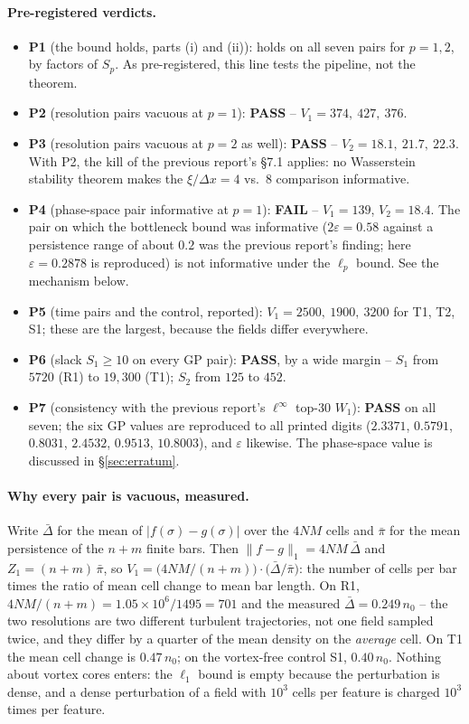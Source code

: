 \documentclass[11pt,a4paper]{article}
\begin{document}
\paragraph{Pre-registered verdicts.}
\begin{itemize}[nosep]
\item \textbf{P1} (the bound holds, parts (i) and (ii)): holds on all seven pairs for $p=1,2$, by
factors of $S_p$. As pre-registered, this line tests the pipeline, not the theorem.
\item \textbf{P2} (resolution pairs vacuous at $p=1$): \textbf{PASS} -- $V_1=374,\ 427,\ 376$.
\item \textbf{P3} (resolution pairs vacuous at $p=2$ as well): \textbf{PASS} -- $V_2=18.1,\ 21.7,\
22.3$. With P2, the kill of the previous report's \S7.1 applies: no Wasserstein stability theorem
makes the $\xi/\Delta x=4$ vs.\ $8$ comparison informative.
\item \textbf{P4} (phase-space pair informative at $p=1$): \textbf{FAIL} -- $V_1=139$, $V_2=18.4$.
The pair on which the bottleneck bound was informative ($2\varepsilon=0.58$ against a persistence
range of about $0.2$ was the previous report's finding; here $\varepsilon=0.2878$ is reproduced) is
not informative under the $\ell_p$ bound. See the mechanism below.
\item \textbf{P5} (time pairs and the control, reported): $V_1=2500,\ 1900,\ 3200$ for T1, T2, S1;
these are the largest, because the fields differ everywhere.
\item \textbf{P6} (slack $S_1\ge10$ on every GP pair): \textbf{PASS}, by a wide margin --
$S_1$ from $5720$ (R1) to $19{,}300$ (T1); $S_2$ from $125$ to $452$.
\item \textbf{P7} (consistency with the previous report's $\ell^\infty$ top-30 $W_1$): \textbf{PASS}
on all seven; the six GP values are reproduced to all printed digits ($2.3371$, $0.5791$, $0.8031$,
$2.4532$, $0.9513$, $10.8003$), and $\varepsilon$ likewise. The phase-space value is discussed in
\S\ref{sec:erratum}.
\end{itemize}

\paragraph{Why every pair is vacuous, measured.} Write $\bar\Delta$ for the mean of
$|f(\sigma)-g(\sigma)|$ over the $4NM$ cells and $\bar\pi$ for the mean persistence of the
$n+m$ finite bars. Then $\|f-g\|_1=4NM\,\bar\Delta$ and $Z_1=(n+m)\,\bar\pi$, so
$V_1=\big(4NM/(n+m)\big)\cdot\big(\bar\Delta/\bar\pi\big)$: the number of cells per bar times
the ratio of mean cell change to mean bar length. On R1, $4NM/(n+m)=1.05\times10^6/1495=701$ and the
measured $\bar\Delta=0.249\,n_0$ -- the two resolutions are two different turbulent trajectories,
not one field sampled twice, and they differ by a quarter of the mean density on the \emph{average}
cell. On T1 the mean cell change is $0.47\,n_0$; on the vortex-free control S1, $0.40\,n_0$. Nothing
about vortex cores enters: the $\ell_1$ bound is empty because the perturbation is dense, and a
dense perturbation of a field with $10^3$ cells per feature is charged $10^3$ times per feature.
\end{document}
